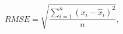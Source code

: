 \begin{equation}
RMSE = \sqrt{\frac{\sum _{i=1}^{n} (x_{i}-\widehat{x}_{i})^{2}}{n}} ,
\label{eq:rootMeanSquareError}
\end{equation}